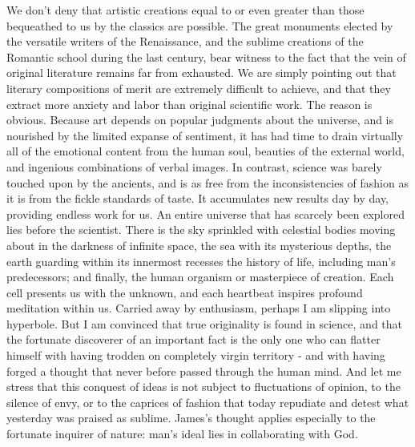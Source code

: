\documentclass{article}
\begin{document}
We don’t deny that artistic creations equal to or even greater than those bequeathed to us by the classics are possible. The great monuments elected by the versatile writers of the Renaissance, and the sublime creations of the Romantic school during the last century, bear witness to the fact that the vein of original literature remains far from exhausted. We are simply pointing out that literary compositions of merit are extremely difficult to achieve, and that they extract more anxiety and labor than original scientific work. The reason is obvious. Because art depends on popular judgments about the universe, and is nourished by the limited expanse of sentiment, it has had time to drain virtually all of the emotional content from the human soul, beauties of the external world, and ingenious combinations of verbal images. In contrast, science was barely touched upon by the ancients, and is as free from the inconsistencies of fashion as it is from the fickle standards of taste. It accumulates new results day by day, providing endless work for us. An entire universe that has scarcely been explored lies before the scientist. There is the sky sprinkled with celestial bodies moving about in the darkness of infinite space, the sea with its mysterious depths, the earth guarding within its innermost recesses the history of life, including man’s predecessors; and finally, the human organism or masterpiece of creation. Each cell presents us with the unknown, and each heartbeat inspires profound meditation within us. Carried away by enthusiasm, perhaps I am slipping into hyperbole. But I am convinced that true originality is found in science, and that the fortunate discoverer of an important fact is the only one who can flatter himself with having trodden on completely virgin territory - and with having forged a thought that never before passed through the human mind. And let me stress that this conquest of ideas is not subject to fluctuations of opinion, to the silence of envy, or to the caprices of fashion that today repudiate and detest what yesterday was praised as sublime. James’s thought applies especially to the fortunate inquirer of nature: man’s ideal lies in collaborating with God.
\end{document}
